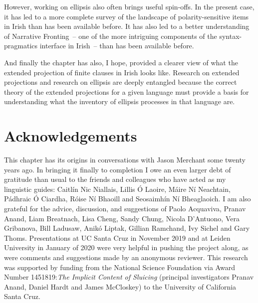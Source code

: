 \documentclass[output=paper,colorlinks,citecolor=brown]{langscibook}
\begin{document}
However, working on ellipsis also often brings useful spin-offs. In the present case, it has led to a more complete survey of the landscape of polarity\hyp sensitive items in Irish than has been available before. It has also led to a better understanding of Narrative Fronting~-- one of the more intriguing components of the syntax-pragmatics interface in Irish~-- than has been available before. 

And finally the chapter has also, I hope, provided a clearer view of what the extended projection of finite clauses in Irish looks like.  Research on extended projections and research on ellipsis are deeply entangled because the correct theory of the extended projections for a given language must provide a basis for understanding what the inventory of ellipsis processes in that language are.

\section*{Acknowledgements}

This chapter has its origins in conversations with Jason Merchant some twenty years ago.  In bringing it finally to completion I owe an even larger debt of gratitude than usual to the friends and colleagues who have acted as my linguistic guides: Caitlín Nic Niallais, Lillis Ó Laoire, Máire Ní Neachtain, Pádhraic Ó Ciardha, Róise Ní Bhaoill and Seosaimhín Ní Bheaglaoich. I am also grateful for the advice, discussion, and suggestions of Paolo Acquaviva, Pranav Anand, Liam Breatnach, Lisa Cheng, Sandy Chung, Nicola D'Antuono, Vera Gribanova, Bill Ladusaw, Anikó Liptak, Gillian Ramchand, Ivy Sichel and Gary Thoms.  Presentations at UC Santa Cruz in November 2019 and at Leiden University in January of 2020 were very helpful in pushing the project along, as were comments and suggestions made by an anonymous reviewer. This research was supported by funding from the National Science Foundation via Award  Number 1451819:\textit{The Implicit Content of Sluicing} (principal investigators Pranav Anand, Daniel Hardt and James McCloskey) to the University of California Santa Cruz.



\end{document}
